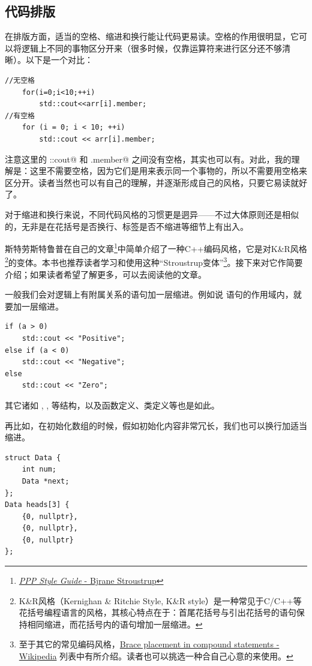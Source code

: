 \subsection*{代码排版}
在排版方面，适当的空格、缩进和换行能让代码更易读。空格的作用很明显，它可以将逻辑上不同的事物区分开来（很多时候，仅靠运算符来进行区分还不够清晰）。以下是一个对比：
\begin{lstlisting}
//无空格
    for(i=0;i<10;++i)
        std::cout<<arr[i].member;
//有空格
    for (i = 0; i < 10; ++i)
        std::cout << arr[i].member;
\end{lstlisting}
注意这里的 \lstinline@std::cout@ 和 \lstinline@arr[i].member@ 之间没有空格，其实也可以有。对此，我的理解是：这里不需要空格，因为它们是用来表示同一个事物的，所以不需要用空格来区分开。读者当然也可以有自己的理解，并逐渐形成自己的风格，只要它易读就好了。\par
对于缩进和换行来说，不同代码风格的习惯更是迵异——不过大体原则还是相似的，无非是在花括号是否换行、标签是否不缩进等细节上有出入。\par
斯特劳斯特鲁普在自己的文章\footnote{\href{https://www.stroustrup.com/Programming/PPP-style.pdf}{\textit{PPP Style Guide} - Bjrane Stroustrup}}中简单介绍了一种C++编码风格，它是对K\&R风格\footnote{K\&R风格（Kernighan \& Ritchie Style, K\&R style）是一种常见于C/C++等花括号编程语言的风格，其核心特点在于：首尾花括号与引出花括号的语句保持相同缩进，而花括号内的语句增加一层缩进。}的变体。本书也推荐读者学习和使用这种``Stroustrup变体''\footnote{至于其它的常见编码风格，\href{https://en.wikipedia.org/wiki/Indentation_style\#Brace_placement_in_compound_statements}{Brace placement in compound statements - Wikipedia} 列表中有所介绍。读者也可以挑选一种合自己心意的来使用。}。接下来对它作简要介绍；如果读者希望了解更多，可以去阅读他的文章。\par
一般我们会对逻辑上有附属关系的语句加一层缩进。例如说 \lstinline@if@ 语句的作用域内，就要加一层缩进。
\begin{lstlisting}
if (a > 0)
    std::cout << "Positive";
else if (a < 0)
    std::cout << "Negative";
else
    std::cout << "Zero";
\end{lstlisting}
其它诸如 \lstinline@for@, \lstinline@while@, \lstinline@switch@ 等结构，以及函数定义、类定义等也是如此。\par\pagebreak
再比如，在初始化数组的时候，假如初始化内容非常冗长，我们也可以换行加适当缩进。
\begin{lstlisting}
struct Data {
    int num;
    Data *next;
};
Data heads[3] {
    {0, nullptr},
    {0, nullptr},
    {0, nullptr}
};
\end{lstlisting}
